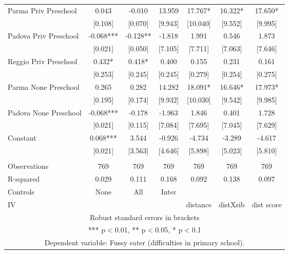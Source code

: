 \begin{tabular}{lcccccc}
Parma Priv Preschool & 0.043 & -0.010 & 13.959 & 17.767* & 16.322* & 17.650* \\
 & [0.108] & [0.070] & [9.943] & [10.040] & [9.552] & [9.995] \\
Padova Priv Preschool & -0.068*** & -0.128** & -1.818 & 1.991 & 0.546 & 1.873 \\
 & [0.021] & [0.050] & [7.105] & [7.711] & [7.063] & [7.646] \\
Reggio Priv Preschool & 0.432* & 0.418* & 0.400 & 0.155 & 0.231 & 0.161 \\
 & [0.253] & [0.245] & [0.245] & [0.279] & [0.254] & [0.275] \\
Parma None Preschool & 0.265 & 0.282 & 14.282 & 18.091* & 16.646* & 17.973* \\
 & [0.195] & [0.174] & [9.932] & [10.030] & [9.542] & [9.985] \\
Padova None Preschool & -0.068*** & -0.178 & -1.963 & 1.846 & 0.401 & 1.728 \\
 & [0.021] & [0.115] & [7.084] & [7.695] & [7.045] & [7.629] \\
Constant & 0.068*** & 3.544 & -0.926 & -4.734 & -3.289 & -4.617 \\
 & [0.021] & [3.563] & [4.646] & [5.898] & [5.023] & [5.810] \\
 &  &  &  &  &  &  \\
Observations & 769 & 769 & 769 & 769 & 769 & 769 \\
R-squared & 0.029 & 0.111 & 0.168 & 0.092 & 0.138 & 0.097 \\
Controls & None & All & Inter &  &  &  \\
 IV &  &  &  & distance & distXsib & dist score \\ \hline
\multicolumn{7}{c}{ Robust standard errors in brackets} \\
\multicolumn{7}{c}{ *** p$<$0.01, ** p$<$0.05, * p$<$0.1} \\
\multicolumn{7}{c}{ Dependent variable: Fussy eater (difficulties in primary school).} \\
\end{tabular}
